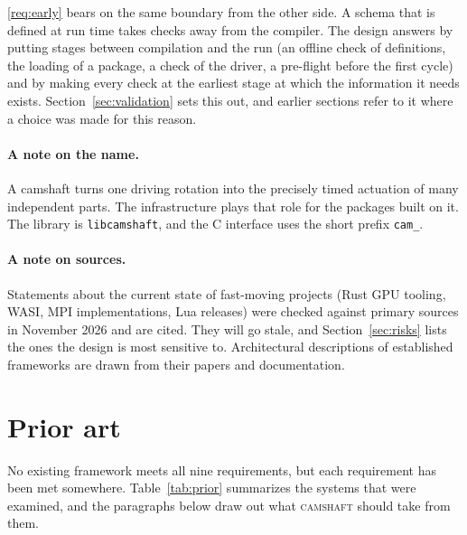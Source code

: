 \documentclass[11pt,a4paper]{article}
\newcommand{\camshaft}{\textsc{camshaft}}
\newcommand{\code}[1]{\texttt{#1}}
\begin{document}
\ref{req:early} bears on the same boundary from the other side.  A schema
that is defined at run time takes checks away from the compiler.  The design
answers by putting stages between compilation and the run (an offline check
of definitions, the loading of a package, a check of the driver, a
pre-flight before the first cycle) and by making every check at the earliest
stage at which the information it needs exists.  Section~\ref{sec:validation}
sets this out, and earlier sections refer to it where a choice was made for
this reason.

\paragraph{A note on the name.}  A camshaft turns one driving rotation into
the precisely timed actuation of many independent parts.  The infrastructure
plays that role for the packages built on it.  The library is
\code{libcamshaft}, and the C interface uses the short prefix \code{cam\_}.

\paragraph{A note on sources.}  Statements about the current state of fast-moving
projects (Rust GPU tooling, WASI, MPI implementations, Lua releases) were
checked against primary sources in November 2026 and are cited.  They will go
stale, and Section~\ref{sec:risks} lists the ones the design is most sensitive
to.  Architectural descriptions of established frameworks are drawn from their
papers and documentation.

\section{Prior art}
\label{sec:prior}

No existing framework meets all nine requirements, but each requirement has
been met somewhere.  Table~\ref{tab:prior} summarizes the systems that were
examined, and the paragraphs below draw out what \camshaft{} should take from
them.
\end{document}
